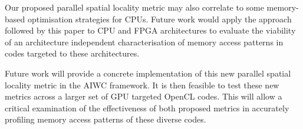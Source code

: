 \documentclass[review=false, sigchi]{acmart}
\begin{document}
	Our proposed parallel spatial locality metric may also correlate to some memory-based optimisation strategies for CPUs. Future work would apply the approach followed by this paper to CPU and FPGA architectures to evaluate the viability of an architecture independent characterisation of memory access patterns in codes targeted to these architectures.
	
	Future work will provide a concrete implementation of this new parallel spatial locality metric in the AIWC framework. It is then feasible to test these new metrics across a larger set of GPU targeted OpenCL codes. This will allow a critical examination of the effectiveness of both proposed metrics in accurately profiling memory access patterns of these diverse codes.

	
	
	
\end{document}

